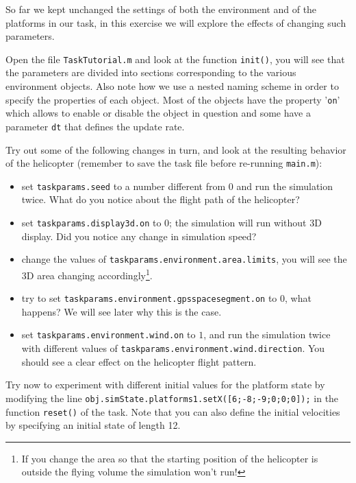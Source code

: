 \documentclass[a4paper,11pt]{article}
\begin{document}
So far we kept unchanged the settings of both the environment and of the platforms in our task, in this exercise we will explore the effects of changing such parameters.

Open the file \texttt{TaskTutorial.m} and look at the function \texttt{init()}, you will see that the parameters are divided into sections corresponding to the various environment objects. Also note how we use a nested naming scheme in order to specify the properties of each object.
Most of the objects have the property '\texttt{on}' which allows to enable or disable the object in question and some have a parameter \texttt{dt} that defines the update rate.

Try out some of the following changes \textsf{in turn}, and look at the resulting behavior of the helicopter (remember to save the task file before re-running \texttt{main.m}): 
\begin{itemize}
 \item set \texttt{taskparams.seed} to a number different from $0$ and run the simulation twice. What do you notice about the flight path of the helicopter?
 \item set \texttt{taskparams.display3d.on} to $0$; the simulation will run without 3D display. Did you notice any change in simulation speed?
 \item change the values of \texttt{taskparams.environment.area.limits}, you will see the 3D area changing accordingly\footnote{If you change the area so that the starting position of the helicopter is outside the flying volume the simulation won't run!}.
 \item try to set \texttt{taskparams.environment.gpsspacesegment.on} to $0$, what happens? We will see later why this is the case.
 \item set \texttt{taskparams.environment.wind.on} to $1$, and run the simulation twice with different values of \texttt{taskparams.environment.wind.direction}. You should see a clear effect on the helicopter flight pattern.
\end{itemize}

Try now to experiment with different initial values for the platform state by modifying the line \texttt{obj.simState.platforms{1}.setX([6;-8;-9;0;0;0]);} in the function \texttt{reset()} of the task. Note that you can also define the initial velocities by specifying an initial state of length 12.
\end{document}

